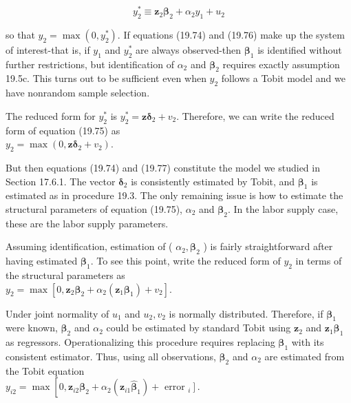\documentclass[10pt]{article}
\begin{document}
\begin{equation*}
y_{2}^{*} \equiv \mathbf{z}_{2} \boldsymbol{\beta}_{2}+\alpha_{2} y_{1}+u_{2} \tag{19.76}
\end{equation*}


so that $y_{2}=\max \left(0, y_{2}^{*}\right)$. If equations (19.74) and (19.76) make up the system of interest-that is, if $y_{1}$ and $y_{2}^{*}$ are always observed-then $\boldsymbol{\beta}_{1}$ is identified without further restrictions, but identification of $\alpha_{2}$ and $\boldsymbol{\beta}_{2}$ requires exactly assumption 19.5c. This turns out to be sufficient even when $y_{2}$ follows a Tobit model and we have nonrandom sample selection.

The reduced form for $y_{2}^{*}$ is $y_{2}^{*}=\mathbf{z} \boldsymbol{\delta}_{2}+v_{2}$. Therefore, we can write the reduced form of equation (19.75) as\\
$y_{2}=\max \left(0, \mathbf{z} \boldsymbol{\delta}_{2}+v_{2}\right)$.

But then equations (19.74) and (19.77) constitute the model we studied in Section 17.6.1. The vector $\boldsymbol{\delta}_{2}$ is consistently estimated by Tobit, and $\boldsymbol{\beta}_{1}$ is estimated as in procedure 19.3. The only remaining issue is how to estimate the structural parameters of equation (19.75), $\alpha_{2}$ and $\boldsymbol{\beta}_{2}$. In the labor supply case, these are the labor supply parameters.

Assuming identification, estimation of ( $\alpha_{2}, \boldsymbol{\beta}_{2}$ ) is fairly straightforward after having estimated $\boldsymbol{\beta}_{1}$. To see this point, write the reduced form of $y_{2}$ in terms of the structural parameters as\\
$y_{2}=\max \left[0, \mathbf{z}_{2} \boldsymbol{\beta}_{2}+\alpha_{2}\left(\mathbf{z}_{1} \boldsymbol{\beta}_{1}\right)+v_{2}\right]$.

Under joint normality of $u_{1}$ and $u_{2}, v_{2}$ is normally distributed. Therefore, if $\boldsymbol{\beta}_{1}$ were known, $\boldsymbol{\beta}_{2}$ and $\alpha_{2}$ could be estimated by standard Tobit using $\mathbf{z}_{2}$ and $\mathbf{z}_{1} \boldsymbol{\beta}_{1}$ as regressors. Operationalizing this procedure requires replacing $\boldsymbol{\beta}_{1}$ with its consistent estimator. Thus, using all observations, $\boldsymbol{\beta}_{2}$ and $\alpha_{2}$ are estimated from the Tobit equation\\
$y_{i 2}=\max \left[0, \mathbf{z}_{i 2} \boldsymbol{\beta}_{2}+\alpha_{2}\left(\mathbf{z}_{i 1} \hat{\boldsymbol{\beta}}_{1}\right)+\right.$ error $\left._{i}\right]$.
\end{document}
